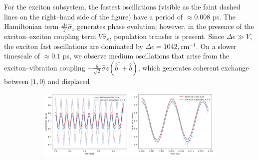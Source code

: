 \documentclass[11pt]{article}
\begin{document}
For the exciton subsystem, the fastest oscillations (visible as the faint dashed lines on the right--hand side of the figure) have a period of $\approx0.008$ ps. The Hamiltonian term $\tfrac{\Delta\epsilon}{2}\hat{\sigma}_z$ generates phase evolution; however, in the presence of the exciton--exciton coupling term $V\hat{\sigma}_x$, population transfer is present. Since $\Delta\epsilon \gg V$, the exciton fast oscillations are dominated by $\Delta\epsilon = 1042,\text{cm}^{-1}$. On a slower timescale of $\approx0.1$ ps, we observe medium oscillations that arise from the exciton--vibration coupling $-\tfrac{g}{\sqrt{2}}\hat{\sigma}z(\hat{b}^\dagger+\hat{b})$, which generates coherent exchange between $|1,0\rangle$ and displaced
\begin{figure}[H]
    \centering

    \begin{subfigure}{\textwidth}
        \centering
        \includegraphics[width=0.49\textwidth]{Research Project/Code/results/ExVib/Closed/Envelope/pops_excited.png}
        \hfill
        \includegraphics[width=0.49\textwidth]{Research Project/Code/results/ExVib/Closed/Fast/pops_excited.png}
        \caption{}
        \label{fig:EVM_CQS_Pop_e0}
    \end{subfigure}

    \vspace{0.8em}


\end{figure}
\end{document}
